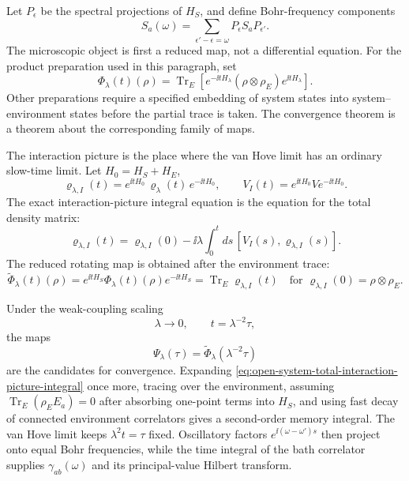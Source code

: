 Let \(P_\epsilon\) be the spectral projections of \(H_S\), and define
Bohr-frequency components
\begin{equation}
  S_a(\omega)
  =
  \sum_{\epsilon'-\epsilon=\omega}
  P_\epsilon S_aP_{\epsilon'} .
  \label{eq:open-system-bohr-components}
\end{equation}
The microscopic object is first a reduced map, not a differential equation.
For the product preparation used in this paragraph, set
\begin{equation}
  \Phi_\lambda(t)(\rho)
  =
  \operatorname{Tr}_E\!\left[
    e^{-\ii tH_\lambda}
    (\rho\otimes\rho_E)
    e^{\ii tH_\lambda}
  \right].
  \label{eq:open-system-microscopic-reduced-map}
\end{equation}
Other preparations require a specified embedding of system states into
system--environment states before the partial trace is taken.  The convergence
theorem is a theorem about the corresponding family of maps.

The interaction picture is the place where the van Hove limit has an ordinary
slow-time limit.  Let \(H_0=H_S+H_E\),
\[
  \varrho_{\lambda,I}(t)
  =
  e^{\ii tH_0}\,
  \varrho_\lambda(t)\,
  e^{-\ii tH_0},
  \qquad
  V_I(t)=e^{\ii tH_0}Ve^{-\ii tH_0}.
\]
The exact interaction-picture integral equation is the equation for the total
density matrix:
\begin{equation}
  \varrho_{\lambda,I}(t)
  =
  \varrho_{\lambda,I}(0)
  -\ii\lambda\int_0^t ds\,
  [V_I(s),\varrho_{\lambda,I}(s)] .
  \label{eq:open-system-total-interaction-picture-integral}
\end{equation}
The reduced rotating map is obtained after the environment trace:
\begin{equation}
  \widetilde\Phi_\lambda(t)(\rho)
  =
  e^{\ii tH_S}\Phi_\lambda(t)(\rho)e^{-\ii tH_S}
  =
  \operatorname{Tr}_E\varrho_{\lambda,I}(t)
  \quad
  \text{for }\varrho_{\lambda,I}(0)=\rho\otimes\rho_E .
  \label{eq:open-system-reduced-interaction-map}
\end{equation}

Under the weak-coupling scaling
\[
  \lambda\to0,
  \qquad
  t=\lambda^{-2}\tau,
\]
the maps
\[
  \Psi_\lambda(\tau)
  =
  \widetilde\Phi_\lambda(\lambda^{-2}\tau)
\]
are the candidates for convergence.  Expanding
\eqref{eq:open-system-total-interaction-picture-integral} once more, tracing
over the environment, assuming
\(\operatorname{Tr}_E(\rho_EE_a)=0\) after absorbing one-point terms into
\(H_S\), and using fast decay of connected environment correlators gives a
second-order memory integral.  The van Hove limit keeps
\(\lambda^2t=\tau\) fixed.  Oscillatory factors
\(e^{\ii(\omega-\omega')s}\) then project onto equal Bohr frequencies,
while the time integral of the bath correlator supplies
\(\gamma_{ab}(\omega)\) and its principal-value Hilbert transform.

